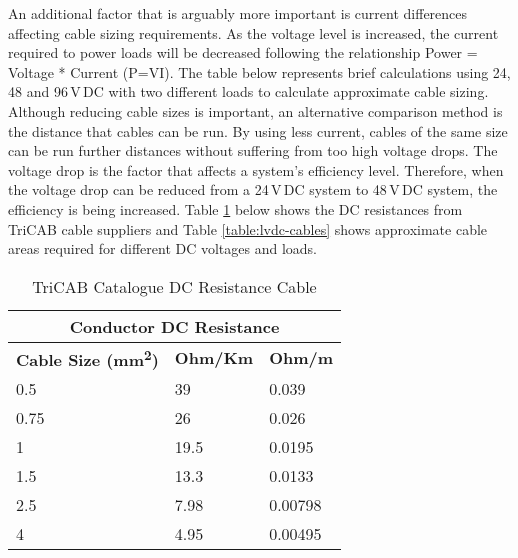 An additional factor that is arguably more important is current differences affecting cable sizing requirements. As the voltage level is increased, the current required to power loads will be decreased following the relationship Power = Voltage * Current (P=VI). The table below represents brief calculations using 24, 48 and 96\,V\,DC with two different loads to calculate approximate cable sizing. Although reducing cable sizes is important, an alternative comparison method is the distance that cables can be run. By using less current, cables of the same size can be run further distances without suffering from too high voltage drops. The voltage drop is the factor that affects a system's efficiency level. Therefore, when the voltage drop can be reduced from a 24\,V\,DC system to 48\,V\,DC system, the efficiency is being increased. Table \ref{table:DC-Resistances} below shows the DC resistances from TriCAB cable suppliers \cite{website:triCAB} and Table \ref{table:lvdc-cables} shows approximate cable areas required for different DC voltages and loads.

\begin{table}[H]
\centering
\begin{tabular}{|l|l|l|}
\hline
\multicolumn{3}{|c|}{\textbf{Conductor DC Resistance}}                                                                                        \\ \hline
\multicolumn{1}{|c|}{\textbf{Cable Size (\si{mm^2})}} & \multicolumn{1}{c|}{\textbf{Ohm/Km}} & \multicolumn{1}{c|}{\textbf{Ohm/m}} \\ \hline
0.5                                                              & 39                                   & 0.039                               \\ \hline
0.75                                                             & 26                                   & 0.026                               \\ \hline
1                                                                & 19.5                                 & 0.0195                              \\ \hline
1.5                                                              & 13.3                                 & 0.0133                              \\ \hline
2.5                                                              & 7.98                                 & 0.00798                             \\ \hline
4                                                                & 4.95                                 & 0.00495 \\ 
\hline     
\end{tabular}
\caption{TriCAB Catalogue DC Resistance Cable \cite{website:triCAB}}
\label{table:DC-Resistances}
\end{table}

